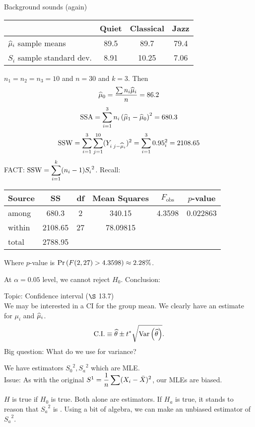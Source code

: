 \example* Background sounds (again)
\begin{center}
    \begin{tabular}{|l|c c c|}
         \hline
          & Quiet & Classical & Jazz\\
         \hline
        $\widehat{\mu}_i$ sample means & 89.5 & 89.7 & 79.4\\
        $S_i$ sample standard dev. & 8.91 & 10.25 & 7.06\\
         \hline
    \end{tabular}
\end{center}
$n_1 = n_2 = n_3 = 10$ and $n = 30$ and $k = 3$. Then
$$\widehat{\mu}_0 =\frac{\sum n_i \widehat{\mu}_i}{n} = 86.2$$
$$\SSA = \sum_{i=1}^{3} n_i \pars{\muh_1 - \muh_0}^2 = 680.3$$
$$\operatorname{SSW} = \sum_{i=1}^3 \sum_{j=1}^{10} (Y_{i\;j - \widehat{\mu}_i})^2 = \sum_{i=1}^3 0.95_i^2 = 2108.65$$
FACT: $\displaystyle \operatorname{SSW} = \sum_{i=1}^k (n_i - 1){S_i}^2$. Recall:
\begin{center}
    \begin{tabular}{|l|c c c c c|}
         \hline
         Source & SS & df & Mean Squares & $F_{\text{obs}}$ & $p$-value\\
         \hline
         among & 680.3 & 2 & 340.15 & 4.3598 & 0.022863\\
         within & 2108.65 & 27  & 78.09815 & & \\
         total & 2788.95 & & & &\\
         \hline
    \end{tabular}
\end{center}
Where $p$-value is $\P{F(2,27) > 4.3598} \approx 2.28\%$.

\nl At $\alpha = 0.05$ level, we cannot reject $H_0$. Conclusion: 

\nnl Topic: Confidence interval ($\S$ 13.7)\\
We may be interested in a CI for the group mean. We clearly have an estimate for $\mu_i$ and $\widehat{\mu}_i$.
$$\text{C.I.} \equiv \that \pm t^* \sqrt{\Var{\that}}.$$
Big question: What do we use for variance?

\nl We have estimators ${S_0}^2, {S_a}^2$ which are MLE. \\Issue: As with the original $S^1 = \displaystyle \over{n}\sum (X_i - \Xbar)^2$, our MLEs are biased.

\nl $H$ is true if $H_0$ is true. Both alone are  estimators. If $H_a$ is true, it stands to reason that ${S_a}^2$ is . Using a bit of algebra, we can make an unbiased estimator of ${S_a}^2$.

